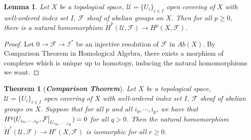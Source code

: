 \documentclass{ctexart}
\newtheorem{theorem}{Theorem}[section]
\newtheorem{lemma}{Lemma}[section]
\begin{document}
\begin{lemma}
    Let $X$ be a topological space, $\mathcal{U} = \{U_{i}\}_{i\in I}$ open covering of $X$ with well-ordered index set $I$, $\mathcal{F}$ sheaf of abelian groups on $X$.
    Then for all $p \ge 0$, there is a natural homomorphism $\check{H}^{p}(\mathcal{U}, \mathcal{F}) \longrightarrow H^{p}(X, \mathcal{F})$.
    \label{Lemma 7.6}
\end{lemma}
\begin{proof}
    Let $0 \longrightarrow \mathcal{F} \longrightarrow \mathcal{I}^{\ast}$ be an injective resolution of $\mathcal{F}$ in $Ab(X)$. 
    By Comparison Theorem in Homological Algebra, there exists a morphism of complexes which is unique up to homotopy,
    inducing the natural homomorphisms we want.
\end{proof}
\begin{theorem}[\textbf{\emph{Comparison Theorem}}]
    Let $X$ be a topological space, $\mathcal{U} = \{U_{i}\}_{i\in I}$ open covering of $X$ with well-ordered index set $I$, $\mathcal{F}$ sheaf of abelian groups on $X$.
    Suppose that for all $p$ and all $i_{0}, \cdots, i_{p}$, we have that $H^{q}(U_{i_{0}, \cdots, i_{p}}, \mathcal{F}\big{|}_{U_{i_{0}, \cdots, i_{p}}}) = 0$ for all $q > 0$.
    Then the natural homomorphism $\check{H}^{r}(\mathcal{U}, \mathcal{F}) \longrightarrow H^{r}(X, \mathcal{F})$ is isomorphic for all $r \ge 0$.
    \label{Theorem 7.5}
\end{theorem}
\end{document}
